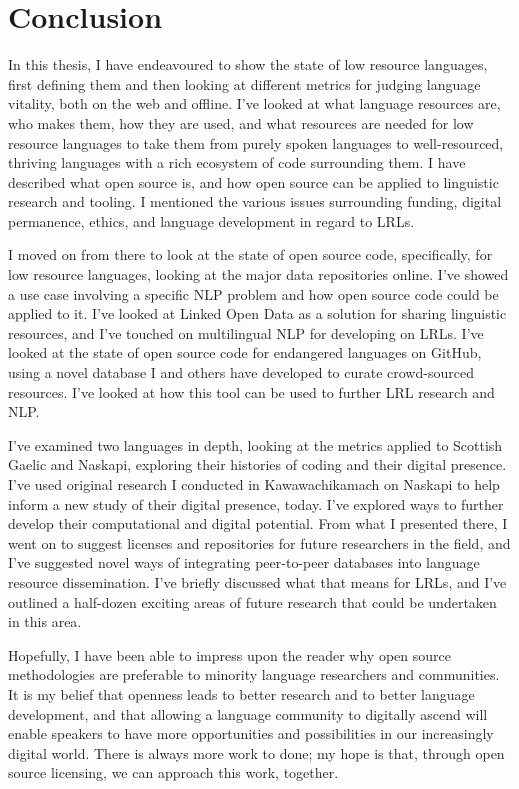 \section{Conclusion}
\label{sec:conclusion}

In this thesis, I have endeavoured to show the state of low resource languages, first defining them and then looking at different metrics for judging language vitality, both on the web and offline. I've looked at what language resources are, who makes them, how they are used, and what resources are needed for low resource languages to take them from purely spoken languages to well-resourced, thriving languages with a rich ecosystem of code surrounding them. I have described what open source is, and how open source can be applied to linguistic research and tooling. I mentioned the various issues surrounding funding, digital permanence, ethics, and language development in regard to LRLs. 

I moved on from there to look at the state of open source code, specifically, for low resource languages, looking at the major data repositories online. I've showed a use case involving a specific NLP problem and how open source code could be applied to it. I've looked at Linked Open Data as a solution for sharing linguistic resources, and I've touched on multilingual NLP for developing on LRLs. I've looked at the state of open source code for endangered languages on GitHub, using a novel database I and others have developed to curate crowd-sourced resources. I've looked at how this tool can be used to further LRL research and NLP. 

I've examined two languages in depth, looking at the metrics applied to Scottish Gaelic and Naskapi, exploring their histories of coding and their digital presence. I've used original research I conducted in Kawawachikamach on Naskapi to help inform a new study of their digital presence, today. I've explored ways to further develop their computational and digital potential. From what I presented there, I went on to suggest licenses and repositories for future researchers in the field, and I've suggested novel ways of integrating peer-to-peer databases into language resource dissemination. I've briefly discussed what that means for LRLs, and I've outlined a half-dozen exciting areas of future research that could be undertaken in this area. 

Hopefully, I have been able to impress upon the reader why open source methodologies are preferable to minority language researchers and communities. It is my belief that openness leads to better research and to better language development, and that allowing a language community to digitally ascend will enable speakers to have more opportunities and possibilities in our increasingly digital world. There is always more work to done; my hope is that, through open source licensing, we can approach this work, together.